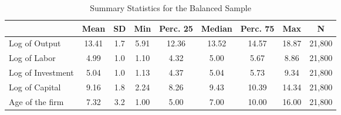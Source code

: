 \begin{table}[htbp]\centering
\def\sym#1{\ifmmode^{#1}\else\(^{#1}\)\fi}
\caption{Summary Statistics for the Balanced Sample \label{tab:balstats}}
\begin{tabular}{l*{1}{cccccccc}}
\toprule
                    &        Mean&          SD&         Min&    Perc. 25&      Median&    Perc. 75&         Max&           N\\
\midrule
Log of Output       &       13.41&         1.7&        5.91&       12.36&       13.52&       14.57&       18.87&      21,800\\
Log of Labor        &        4.99&         1.0&        1.10&        4.32&        5.00&        5.67&        8.86&      21,800\\
Log of Investment   &        5.04&         1.0&        1.13&        4.37&        5.04&        5.73&        9.34&      21,800\\
Log of Capital      &        9.16&         1.8&        2.24&        8.26&        9.43&       10.39&       14.34&      21,800\\
Age of the firm     &        7.32&         3.2&        1.00&        5.00&        7.00&       10.00&       16.00&      21,800\\
\bottomrule
\end{tabular}
\end{table}
